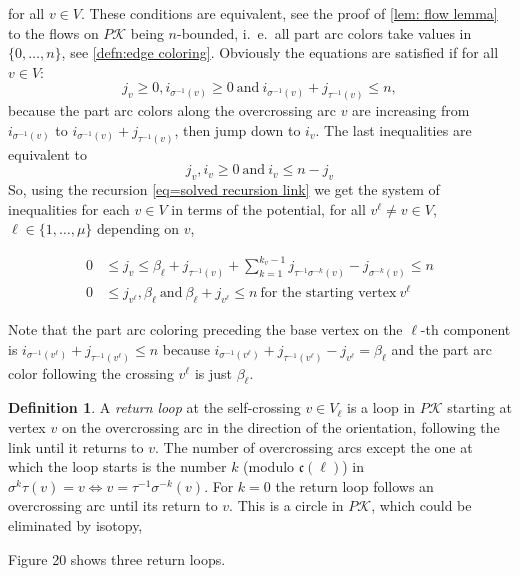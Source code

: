 \documentclass[11pt]{article}
\theoremstyle{definition}
\newtheorem{defn}{Definition}[section]
\theoremstyle{remark}
\theoremstyle{remark}
\begin{document}
for all $v\in V$. These conditions are equivalent, see the proof of \ref{lem: flow lemma} to the flows on $P\mathcal{K}$ being $n$-bounded, i.\ e.\ all part arc colors take values in $\{0,\ldots ,n\}$, see \ref{defn:edge coloring}.
Obviously the equations are satisfied if for all $v\in V$:
$$j_v\geq 0, i_{\sigma ^{-1}(v)}\geq 0 \ \textrm{and}\ i_{\sigma^{-1}(v)}+j_{\tau^{-1}(v)}\leq n,$$
because the part arc colors along the overcrossing arc $v$ are increasing from $i_{\sigma^{-1}(v)}$ to $i_{\sigma^{-1}(v)}+j_{\tau^{-1}(v)}$, then jump down to $i_v$. 
The last inequalities are equivalent to 
$$j_v, i_v\geq 0 \ \textrm{and}  \ i_v\leq n-j_v$$
So, using the recursion \eqref{eq=solved recursion link} we get the system of inequalities for each $v\in V$ in terms of the potential, for all $v^{\ell }\neq v\in V$, $\ell \in \{1,\ldots ,\mu\}$ depending on $v$,

\begin{equation}\label{eq=contributing}
\begin{aligned}
0&\leq j_v\leq \beta_{\ell }+j_{\tau^{-1}(v)}+\sum_{k=1}^{k_v-1}j_{\tau^{-1}\sigma^{-k}(v)}-j_{\sigma^{-k}(v)}\leq n \\
0&\leq j_{v^{\ell }},\beta_{\ell } \ \textrm{and}\ \beta_{\ell }+j_{v^{\ell }}\leq n \ \textrm{for the starting vertex}\ v^{\ell }
\end{aligned}
\end{equation}

Note that the part arc coloring preceding the base vertex on the $\ell $-th component is
$i_{\sigma^{-1}(v^{\ell })}+j_{\tau^{-1}(v^{\ell })}\leq n$ because $i_{\sigma^{-1}(v^{\ell })}+j_{\tau^{-1}(v^{\ell })}-j_{v^{\ell }}=\beta _{\ell }$ and the part arc color following the crossing $v^{\ell }$ is just $\beta_{\ell }$.

\begin{defn} A \textit{return loop} at the self-crossing $v\in V_{\ell }$ is a loop in $P\mathcal{K}$ starting at vertex $v$ on the overcrossing arc in the direction of the orientation, following the link until it returns to $v$. The number of overcrossing arcs except the one at which the loop starts is the number $k$ (modulo $\mathfrak{c}(\ell )$) in $\sigma^k\tau (v)=v \Longleftrightarrow v=\tau^{-1}\sigma^{-k}(v)$. For $k=0$ the return loop follows an overcrossing arc until its return to $v$. This is a circle in $P\mathcal{K}$, which could be eliminated by isotopy, 
\end{defn}

Figure 20 shows three return loops. 
\end{document}
